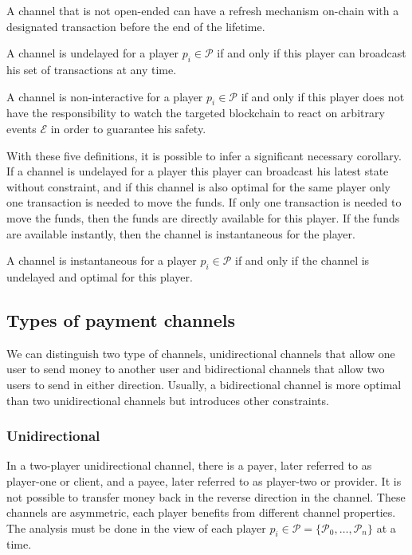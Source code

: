 \documentclass{llncs}
\begin{document}
A channel that is not open-ended can have a refresh mechanism on-chain with a designated transaction before the end of the lifetime.

\begin{definition}[Undelayed] A channel is undelayed for a player $p_i \in \mathcal{P}$ if and only if this player can broadcast his set of transactions at any time.
\end{definition}

\begin{definition} A channel is non-interactive for a player $p_i \in \mathcal{P}$ if and only if this player does not have the responsibility to watch the targeted blockchain to react on arbitrary events $\mathcal{E}$ in order to guarantee his safety.
\end{definition}

With these five definitions, it is possible to infer a significant necessary corollary. If a channel is undelayed for a player this player can broadcast his latest state without constraint, and if this channel is also optimal for the same player only one transaction is needed to move the funds. If only one transaction is needed to move the funds, then the funds are directly available for this player. If the funds are available instantly, then the channel is instantaneous for the player.

\begin{corollary}[Instantaneous] A channel is instantaneous for a player $p_i \in \mathcal{P}$ if and only if the channel is undelayed and optimal for this player.
\end{corollary}

\subsection{Types of payment channels}

We can distinguish two type of channels, unidirectional channels that allow one user to send money to another user and bidirectional channels that allow two users to send in either direction. Usually, a bidirectional channel is more optimal than two unidirectional channels but introduces other constraints.

\subsubsection{Unidirectional}

In a two-player unidirectional channel, there is a payer, later referred to as player-one or client, and a payee, later referred to as player-two or provider.  It is not possible to transfer money back in the reverse direction in the channel. These channels are asymmetric, each player benefits from different channel properties. The analysis must be done in the view of each player $p_i \in \mathcal{P} = \{\mathcal{P}_0, \dots, \mathcal{P}_n\}$ at a time.
\end{document}
